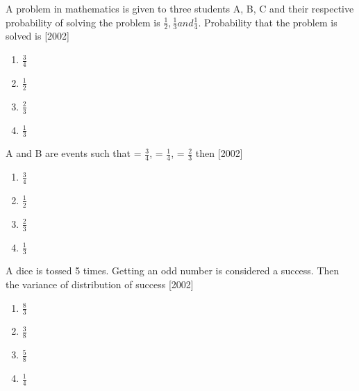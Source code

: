 
\iffalse
  \title{PROBABILITY}
  \author{Teja vardhan}
  \section{mcq-single}
\fi
\item A problem in mathematics is given to three students A, B, C and their respective probability of solving the problem is $\frac{1}{2}, \frac{1}{3} and \frac{1}{4}$. Probability that the problem is solved is  \hfill [2002]

        \begin{multicols}{4}
        \begin{enumerate}
            \item $\frac{3}{4}$
            \item $\frac{1}{2}$
            \item $\frac{2}{3}$
            \item $\frac{1}{3}$   
        \end{enumerate}
        \end{multicols}
        


    \item A and B are events such that  = $\frac{3}{4}$,  = $\frac{1}{4}$,  = $\frac{2}{3}$ then  \hfill [2002]

        \begin{multicols}{4}
        \begin{enumerate}
            \item $\frac{3}{4}$
            \item $\frac{1}{2}$
            \item $\frac{2}{3}$
            \item $\frac{1}{3}$
        \end{enumerate}
        \end{multicols}


    \item A dice is tossed 5 times. Getting an odd number is considered a success. Then the variance of distribution of success \hfill [2002]

        \begin{multicols}{4}
        \begin{enumerate}
            \item $\frac{8}{3}$
            \item $\frac{3}{8}$
            \item $\frac{5}{8}$
            \item $\frac{1}{4}$   
        \end{enumerate}
        \end{multicols}
        

